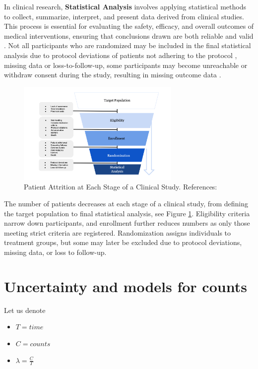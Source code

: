 In clinical research, \textbf{Statistical Analysis} involves applying statistical methods to collect, summarize, interpret, and present data derived from clinical studies. This process is essential for evaluating the safety, efficacy, and overall outcomes of medical interventions, ensuring that conclusions drawn are both reliable and valid \citep{panos2023statistical}. Not all participants who are randomized may be included in the final statistical analysis due to protocol deviations of patients not adhering to the protocol \citep{rehman2020exclusion}, missing data \citep{shih2002problems} or loss-to-follow-up, some participants may become unreachable or withdraw consent during the study, resulting in missing outcome data \citep{nuesch2009effects}.

\begin{figure}[h]
  \centering
  \includegraphics[width=0.7\textwidth]{fig_2_1.png}
  \caption{Patient Attrition at Each Stage of a Clinical Study. References: \cite{piantadosi2022principles, whelan2018high, bogin2022lasagna}}
  \label{fig:2_1}
\end{figure}

The number of patients decreases at each stage of a clinical study, from defining the target population to final statistical analysis, see Figure \ref{fig:2_1}. Eligibility criteria narrow down participants, and enrollment further reduces numbers as only those meeting strict criteria are registered. Randomization assigns individuals to treatment groups, but some may later be excluded due to protocol deviations, missing data, or loss to follow-up. 


\section{Uncertainty and models for counts}

Let us denote

\begin{itemize}
\item $T=time$
\item $C=counts$
\item $\lambda=\frac{C}{T}$
\end{itemize}

